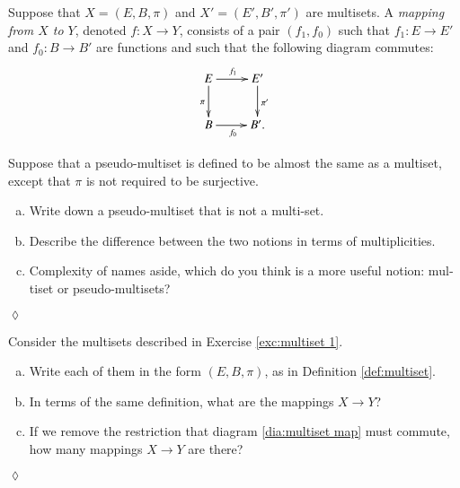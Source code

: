 \documentclass{book}
\def\to{\rightarrow}
\def\taking{\colon}
\theoremstyle{theoremENG}
\theoremstyle{lemmaENG}
\theoremstyle{propositionENG}
\theoremstyle{corollaryENG}
\theoremstyle{factENG}
\theoremstyle{remarkENG}
\theoremstyle{exampleENG}
\theoremstyle{warningENG}
\theoremstyle{questionENG}
\theoremstyle{guessENG}
\theoremstyle{answerENG}
\theoremstyle{constructionENG}
\theoremstyle{rulesENG}
\theoremstyle{excENG}
\newtheorem{excENG}[subsubsection]{\begin{english}Exercise\end{english}}
\theoremstyle{appENG}
\theoremstyle{definitionENG}
\newtheorem{definitionENG}[subsubsection]{\begin{english}Definition\end{english}}
\theoremstyle{notationENG}
\theoremstyle{conjectureENG}
\theoremstyle{postulateENG}
\newenvironment{exerciseENG}{\begin{excENG}}{\hspace*{\fill}$\lozenge$\end{excENG}}
\theoremstyle{theoremRUS}
\theoremstyle{lemmaRUS}
\theoremstyle{propositionRUS}
\theoremstyle{corollaryRUS}
\theoremstyle{factRUS}
\theoremstyle{remarkRUS}
\theoremstyle{exampleRUS}
\theoremstyle{warningRUS}
\theoremstyle{questionRUS}
\theoremstyle{guessRUS}
\theoremstyle{answerRUS}
\theoremstyle{constructionRUS}
\theoremstyle{rulesRUS}
\theoremstyle{excRUS}
\theoremstyle{appRUS}
\theoremstyle{definitionRUS}
\theoremstyle{notationRUS}
\theoremstyle{conjectureRUS}
\theoremstyle{postulateRUS}
\def\sexc{\begin{enumerate}[a.)]\setlength{\itemsep}{.1cm}\setlength{\parskip}{.1cm}\item}
\def\next{\item}
\def\endsexc{\end{enumerate}}
\begin{document}
\begin{english}
\begin{definitionENG}
\begin{russian} \end{russian}

Suppose that $X=(E,B,\pi)$ and $X'=(E',B',\pi')$ are multisets. A {\em mapping from $X$ to $Y$}, denoted $f\taking X\to Y$, consists of a pair $(f_1,f_0)$ such that $f_1\taking E\to E'$ and $f_0\taking B\to B'$ are functions and such that the following diagram commutes:
\begin{align}\label{dia:multiset map}
\xymatrix{E\ar[r]^{f_1}\ar[d]_{\pi}&E'\ar[d]^{\pi'}\\B\ar[r]_{f_0}&B'.}
\end{align}

\begin{russian} \end{russian}

\end{definitionENG}

\begin{exerciseENG}

Suppose that a pseudo-multiset is defined to be almost the same as a multiset, except that $\pi$ is not required to be surjective. 
\sexc Write down a pseudo-multiset that is not a multi-set. 
\next Describe the difference between the two notions in terms of multiplicities. 
\next Complexity of names aside, which do you think is a more useful notion: multiset or pseudo-multisets? 
\endsexc

\begin{russian} \end{russian}

\end{exerciseENG}

\begin{exerciseENG}

Consider the multisets described in Exercise \ref{exc:multiset 1}. 
\sexc Write each of them in the form $(E,B,\pi)$, as in Definition \ref{def:multiset}. 
\next In terms of the same definition, what are the mappings $X\to Y$? 
\next If we remove the restriction that diagram \ref{dia:multiset map} must commute, how many mappings $X\to Y$ are there?
\endsexc

\begin{russian} \end{russian}

\end{exerciseENG}


\end{english}
\end{document}
